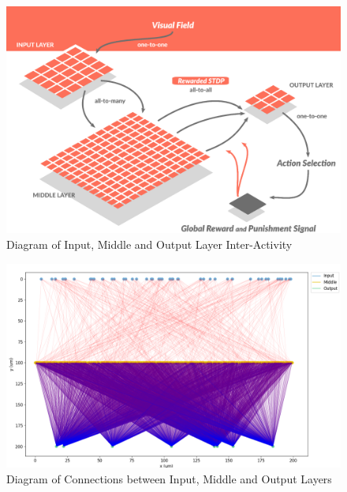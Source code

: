 \documentclass[11pt, twocolumn]{article}
\begin{document}
\vspace{-3mm}
\begin{figure}[H]
	\centering
	\includegraphics[width=\linewidth]{layers_diagram}
	\caption{Diagram of Input, Middle and Output Layer Inter-Activity \cite{sanda2017multi}}
	\label{fig:layers_diagram}
\end{figure}
\begin{figure}[H]
	\centering
	\includegraphics[width=\linewidth]{network_connections}
	\caption{Diagram of Connections between Input, Middle and Output Layers}
	\label{fig:network_connections}
\end{figure}
\end{document}
